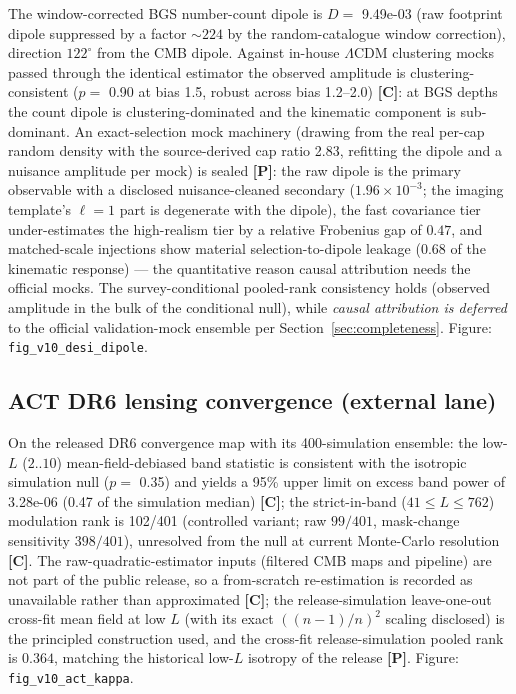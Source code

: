 \documentclass[10pt]{article}
\theoremstyle{definition}
\newcommand{\code}[1]{\texttt{\small #1}}
\newcommand{\tier}[1]{\textbf{[#1]}}
\begin{document}
The window-corrected BGS number-count dipole is
$D = $ 9.49e-03 (raw footprint dipole suppressed by a factor
${\sim}224$ by the random-catalogue window correction), direction
$122^\circ$ from the CMB dipole. Against in-house $\Lambda$CDM
clustering mocks passed through the identical estimator the observed
amplitude is clustering-consistent ($p = $ 0.90 at bias 1.5,
robust across bias 1.2--2.0) \tier{C}: at BGS depths the count dipole
is clustering-dominated and the kinematic component is sub-dominant.
An exact-selection mock machinery (drawing from the real per-cap
random density with the source-derived cap ratio 2.83, refitting the
dipole and a nuisance amplitude per mock) is sealed \tier{P}: the
raw dipole is the primary observable with a disclosed
nuisance-cleaned secondary ($1.96\times10^{-3}$; the imaging
template's $\ell = 1$ part is degenerate with the dipole), the fast
covariance tier under-estimates the high-realism tier by a relative
Frobenius gap of $0.47$, and matched-scale injections show material
selection-to-dipole leakage ($0.68$ of the kinematic response) ---
the quantitative reason causal attribution needs the official mocks.
The survey-conditional pooled-rank consistency holds (observed
amplitude in the bulk of the conditional null), while \emph{causal
attribution is deferred} to the official validation-mock ensemble
per Section~\ref{sec:completeness}.
Figure: \code{fig\_v10\_desi\_dipole}.

\subsection{ACT DR6 lensing convergence (external lane)}

On the released DR6 convergence map \cite{Madhavacheril2024, Qu2024}
with its 400-simulation ensemble: the low-$L$ ($2..10$)
mean-field-debiased band statistic is consistent with the isotropic
simulation null ($p = $ 0.35) and yields a 95\% upper limit on
excess band power of 3.28e-06 (0.47 of the simulation
median) \tier{C}; the strict-in-band ($41 \le L \le 762$) modulation
rank is 102/401 (controlled variant; raw $99/401$,
mask-change sensitivity $398/401$), unresolved from the null at
current Monte-Carlo resolution \tier{C}. The raw-quadratic-estimator inputs
(filtered CMB maps and pipeline) are not part of the public release,
so a from-scratch re-estimation is recorded as unavailable rather
than approximated \tier{C}; the release-simulation leave-one-out
cross-fit mean field at low $L$ (with its exact $((n{-}1)/n)^2$
scaling disclosed) is the principled construction used, and the
cross-fit release-simulation pooled rank is $0.364$, matching the
historical low-$L$ isotropy of the release \tier{P}.
Figure: \code{fig\_v10\_act\_kappa}.
\end{document}
